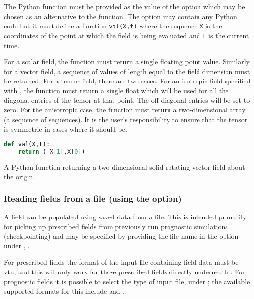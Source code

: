 The Python function must be provided as the value of the
 option which may be chosen as an alternative to the
 function. The option may contain any Python code
but it must define a function \lstinline[language=Python]+val(X,t)+ where
the sequence \lstinline[language=Python]+X+ is the coordinates of the point
at which the field is being evaluated and \lstinline[language=Python]+t+ is
the current time. 

For a scalar field, the function must return a single floating point
value. Similarly for a vector field, a sequence of values of length equal to
the field dimension must be returned. For a tensor field, there are two
cases. For an isotropic field specified with
, the function must return a single
float which will be used for all the diagonal entries of the tensor at that
point. The off-diagonal entries will be set to zero. For the anisotropic case,
the function must return a two-dimensional array (a sequence of
sequences). It is the user's responsibility to ensure that the tensor is
symmetric in cases where it should be.

\begin{example}
  \begin{lstlisting}[language=Python]
def val(X,t):
    return (-X[1],X[0])
  \end{lstlisting}
  \caption{A Python function returning a two-dimensional solid rotating
    vector field about the origin.}
\end{example}

\subsubsection{Reading fields from a file (using the  option)}
A field can be populated using saved data from a file. This is intended primarily
for picking up prescribed fields from previously run prognostic simulations
(checkpointing) and may be specified by providing the file name in
the  option under ,
.

For prescribed fields the format of the input file containing field data must be
vtu, and this will only work for those prescribed fields directly underneath
. For prognostic fields it is possible to select
the type of input file, under ;
the available supported formats for this include  and .

